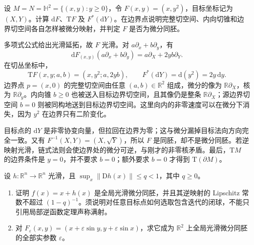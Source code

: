 \begin{exercise}
	\label{g1:ex:halfplane-square-differential}
	设 \(M=N=\mathbb H^2=\{(x,y):y\ge0\}\)，令 \(F(x,y)=(x,y^2)\)，目标坐标记为 \((X,Y)\)。计算 \(\mathrm{d}F\)、\(\mathrm{T}F\) 及 \(F^*(\mathrm{d}Y)\)。在边界点说明完整切空间、内向切锥和边界切空间各自怎样被微分映射，并判定 \(F\) 是否为微分同胚。
\end{exercise}
\begin{solution}
	多项式公式给出光滑延拓，故 \(F\) 光滑。对 \(a\partial_x+b\partial_y\)，有
	\[
		\mathrm{d}F_{(x,y)}(a\partial_x+b\partial_y)
		=a\partial_X+2yb\partial_Y.
	\]
	在切丛坐标中，
	\[
		\mathrm{T}F(x,y;a,b)=(x,y^2;a,2yb),\qquad
		F^*(\mathrm{d}Y)=\mathrm{d}(y^2)=2y\,\mathrm{d}y.
	\]
	边界点 \(p=(x,0)\) 的完整切空间由任意 \((a,b)\in\mathbb R^2\) 组成，微分的像为 \(\mathbb R\partial_X\)，核为 \(\mathbb R\partial_y\)。内向锥 \(b\ge0\) 也被送入目标边界切空间，且其像仍是整条 \(\mathbb R\partial_X\)；源边界切空间 \(b=0\) 则被同构地送到目标边界切空间。这里向内的非零速度可以在微分下消失，因为 \(y^2\) 在边界只有二阶变化。

	目标点的 \(\mathrm{d}Y\) 是非零协变向量，但拉回在边界为零；这与微分漏掉目标法向方向完全一致。又有 \(F^{-1}(X,Y)=(X,\sqrt Y)\)，所以 \(F\) 是同胚，却不是微分同胚。若逆映射光滑，链式法则会使边界处的微分可逆，与刚才的非零核矛盾。最后，\(\mathrm{T}M\) 的边界条件是 \(y=0\)，并不要求 \(b=0\)；额外要求 \(b=0\) 才得到 \(\mathrm{T}(\partial M)\)。
\end{solution}
\begin{exercise}
	\label{g1:ex:global-small-perturbation}
	设 \(h:\mathbb R^n\to\mathbb R^n\) 光滑，且 \(\sup_x\|\mathrm{D}h(x)\|\leq q<1\)，其中 \(q\geq0\)。
	\begin{enumerate}
		\item 证明 \(f(x)=x+h(x)\) 是全局光滑微分同胚，并且其逆映射的 Lipschitz 常数不超过 \((1-q)^{-1}\)。须说明对任意目标点如何选取包含迭代的闭球，不能只引用局部逆函数定理声称满射。
		\item 对 \(F_\varepsilon(x,y)=(x+\varepsilon\sin y,y+\varepsilon\sin x)\)，求它成为 \(\mathbb R^2\) 上全局光滑微分同胚的全部实参数 \(\varepsilon\)。
	\end{enumerate}
\end{exercise}
